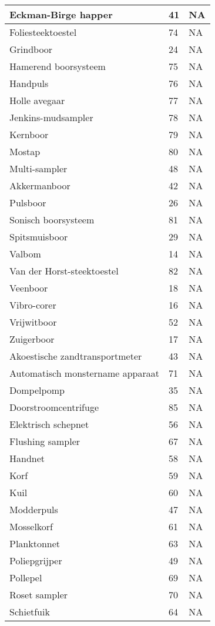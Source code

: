 \documentclass[
]{book}
\begin{document}
\begin{tabular}[t]{l|l|l}
\hline
Eckman-Birge happer & 41 & NA\\
\hline
Foliesteektoestel & 74 & NA\\
\hline
Grindboor & 24 & NA\\
\hline
Hamerend boorsysteem & 75 & NA\\
\hline
Handpuls & 76 & NA\\
\hline
Holle avegaar & 77 & NA\\
\hline
Jenkins-mudsampler & 78 & NA\\
\hline
Kernboor & 79 & NA\\
\hline
Mostap & 80 & NA\\
\hline
Multi-sampler & 48 & NA\\
\hline
Akkermanboor & 42 & NA\\
\hline
Pulsboor & 26 & NA\\
\hline
Sonisch boorsysteem & 81 & NA\\
\hline
Spitsmuisboor & 29 & NA\\
\hline
Valbom & 14 & NA\\
\hline
Van der Horst-steektoestel & 82 & NA\\
\hline
Veenboor & 18 & NA\\
\hline
Vibro-corer & 16 & NA\\
\hline
Vrijwitboor & 52 & NA\\
\hline
Zuigerboor & 17 & NA\\
\hline
Akoestische zandtransportmeter & 43 & NA\\
\hline
Automatisch monstername apparaat & 71 & NA\\
\hline
Dompelpomp & 35 & NA\\
\hline
Doorstroomcentrifuge & 85 & NA\\
\hline
Elektrisch schepnet & 56 & NA\\
\hline
Flushing sampler & 67 & NA\\
\hline
Handnet & 58 & NA\\
\hline
Korf & 59 & NA\\
\hline
Kuil & 60 & NA\\
\hline
Modderpuls & 47 & NA\\
\hline
Mosselkorf & 61 & NA\\
\hline
Planktonnet & 63 & NA\\
\hline
Poliepgrijper & 49 & NA\\
\hline
Pollepel & 69 & NA\\
\hline
Roset sampler & 70 & NA\\
\hline
Schietfuik & 64 & NA\\

\end{tabular}
\end{document}
